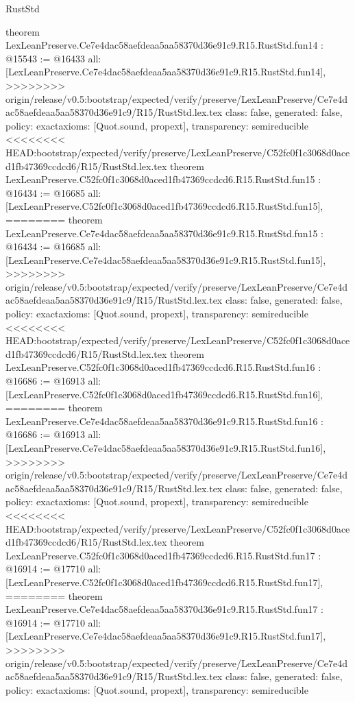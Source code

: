 \begin{lexlean}{RustStd}
\begin{coremodule}
{\begin{coremodule}
{{{{{{{{{{{{{{{{{theorem LexLeanPreserve.Ce7e4dac58aefdeaa5aa58370d36e91c9.R15.RustStd.fun14 : @15543 := @16433 {
  all: [LexLeanPreserve.Ce7e4dac58aefdeaa5aa58370d36e91c9.R15.RustStd.fun14],
>>>>>>>> origin/release/v0.5:bootstrap/expected/verify/preserve/LexLeanPreserve/Ce7e4dac58aefdeaa5aa58370d36e91c9/R15/RustStd.lex.tex
  class: false,
  generated: false,
  policy: exact{axioms: [Quot.sound, propext]},
  transparency: semireducible
}
<<<<<<<< HEAD:bootstrap/expected/verify/preserve/LexLeanPreserve/C52fc0f1c3068d0aced1fb47369ccdcd6/R15/RustStd.lex.tex
theorem LexLeanPreserve.C52fc0f1c3068d0aced1fb47369ccdcd6.R15.RustStd.fun15 : @16434 := @16685 {
  all: [LexLeanPreserve.C52fc0f1c3068d0aced1fb47369ccdcd6.R15.RustStd.fun15],
========
theorem LexLeanPreserve.Ce7e4dac58aefdeaa5aa58370d36e91c9.R15.RustStd.fun15 : @16434 := @16685 {
  all: [LexLeanPreserve.Ce7e4dac58aefdeaa5aa58370d36e91c9.R15.RustStd.fun15],
>>>>>>>> origin/release/v0.5:bootstrap/expected/verify/preserve/LexLeanPreserve/Ce7e4dac58aefdeaa5aa58370d36e91c9/R15/RustStd.lex.tex
  class: false,
  generated: false,
  policy: exact{axioms: [Quot.sound, propext]},
  transparency: semireducible
}
<<<<<<<< HEAD:bootstrap/expected/verify/preserve/LexLeanPreserve/C52fc0f1c3068d0aced1fb47369ccdcd6/R15/RustStd.lex.tex
theorem LexLeanPreserve.C52fc0f1c3068d0aced1fb47369ccdcd6.R15.RustStd.fun16 : @16686 := @16913 {
  all: [LexLeanPreserve.C52fc0f1c3068d0aced1fb47369ccdcd6.R15.RustStd.fun16],
========
theorem LexLeanPreserve.Ce7e4dac58aefdeaa5aa58370d36e91c9.R15.RustStd.fun16 : @16686 := @16913 {
  all: [LexLeanPreserve.Ce7e4dac58aefdeaa5aa58370d36e91c9.R15.RustStd.fun16],
>>>>>>>> origin/release/v0.5:bootstrap/expected/verify/preserve/LexLeanPreserve/Ce7e4dac58aefdeaa5aa58370d36e91c9/R15/RustStd.lex.tex
  class: false,
  generated: false,
  policy: exact{axioms: [Quot.sound, propext]},
  transparency: semireducible
}
<<<<<<<< HEAD:bootstrap/expected/verify/preserve/LexLeanPreserve/C52fc0f1c3068d0aced1fb47369ccdcd6/R15/RustStd.lex.tex
theorem LexLeanPreserve.C52fc0f1c3068d0aced1fb47369ccdcd6.R15.RustStd.fun17 : @16914 := @17710 {
  all: [LexLeanPreserve.C52fc0f1c3068d0aced1fb47369ccdcd6.R15.RustStd.fun17],
========
theorem LexLeanPreserve.Ce7e4dac58aefdeaa5aa58370d36e91c9.R15.RustStd.fun17 : @16914 := @17710 {
  all: [LexLeanPreserve.Ce7e4dac58aefdeaa5aa58370d36e91c9.R15.RustStd.fun17],
>>>>>>>> origin/release/v0.5:bootstrap/expected/verify/preserve/LexLeanPreserve/Ce7e4dac58aefdeaa5aa58370d36e91c9/R15/RustStd.lex.tex
  class: false,
  generated: false,
  policy: exact{axioms: [Quot.sound, propext]},
  transparency: semireducible
}}}}}}}}}}}}}}}}}}}}}
\end{coremodule}}
\end{coremodule}
\end{lexlean}

